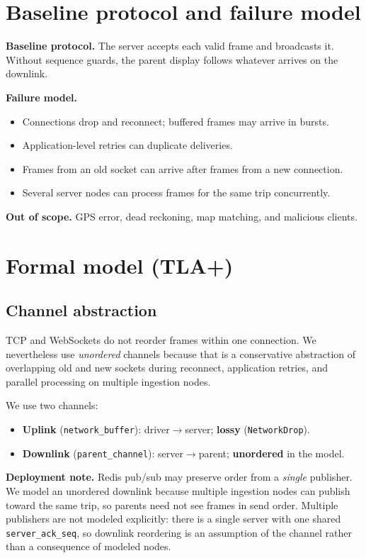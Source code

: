 \documentclass[11pt,a4paper]{article}
\begin{document}
\section{Baseline protocol and failure model}
\label{sec:failures}

\textbf{Baseline protocol.} The server accepts each valid frame and broadcasts it. Without sequence guards, the parent display follows whatever arrives on the downlink.

\textbf{Failure model.}
\begin{itemize}[noitemsep]
  \item Connections drop and reconnect; buffered frames may arrive in bursts.
  \item Application-level retries can duplicate deliveries.
  \item Frames from an old socket can arrive after frames from a new connection.
  \item Several server nodes can process frames for the same trip concurrently.
\end{itemize}

\textbf{Out of scope.} GPS error, dead reckoning, map matching, and malicious clients.

\section{Formal model (TLA+)}
\label{sec:model}

\subsection{Channel abstraction}

TCP and WebSockets do not reorder frames within one connection. We nevertheless use \emph{unordered} channels because that is a conservative abstraction of overlapping old and new sockets during reconnect, application retries, and parallel processing on multiple ingestion nodes.

We use two channels:
\begin{itemize}[noitemsep]
  \item \textbf{Uplink} (\texttt{network\_buffer}): driver$\rightarrow$server; \textbf{lossy} (\texttt{NetworkDrop}).
  \item \textbf{Downlink} (\texttt{parent\_channel}): server$\rightarrow$parent; \textbf{unordered} in the model.
\end{itemize}

\textbf{Deployment note.} Redis pub/sub may preserve order from a \emph{single} publisher. We model an unordered downlink because multiple ingestion nodes can publish toward the same trip, so parents need not see frames in send order. Multiple publishers are not modeled explicitly: there is a single server with one shared \texttt{server\_ack\_seq}, so downlink reordering is an assumption of the channel rather than a consequence of modeled nodes.
\end{document}
